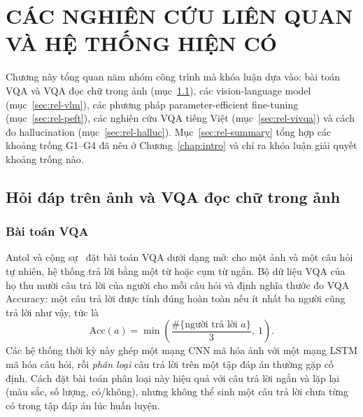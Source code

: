 
\chapter{CÁC NGHIÊN CỨU LIÊN QUAN VÀ HỆ THỐNG HIỆN CÓ}
\label{chap:related}

\ifpdf
    \graphicspath{{Chapter3/Figs/Raster/}{Chapter3/Figs/PDF/}{Chapter3/Figs/}}
\else
    \graphicspath{{Chapter3/Figs/Vector/}{Chapter3/Figs/}}
\fi


Chương này tổng quan năm nhóm công trình mà khóa luận dựa vào: bài toán VQA và
VQA đọc chữ trong ảnh (mục~\ref{sec:rel-vqa}), các vision-language model
(mục~\ref{sec:rel-vlm}), các phương pháp parameter-efficient fine-tuning
(mục~\ref{sec:rel-peft}), các nghiên cứu VQA tiếng Việt
(mục~\ref{sec:rel-vivqa}) và cách đo hallucination (mục~\ref{sec:rel-halluc}).
Mục~\ref{sec:rel-summary} tổng hợp các khoảng trống G1--G4 đã nêu ở
Chương~\ref{chap:intro} và chỉ ra khóa luận giải quyết khoảng trống nào.

\section{Hỏi đáp trên ảnh và VQA đọc chữ trong ảnh}
\label{sec:rel-vqa}

\subsection{Bài toán VQA}

Antol và cộng sự~\cite{antol2015vqa} đặt bài toán VQA dưới dạng mở: cho một ảnh và một câu hỏi
tự nhiên, hệ thống trả lời bằng một từ hoặc cụm từ ngắn. Bộ dữ liệu VQA của họ
thu mười câu trả lời của người cho mỗi câu hỏi và định nghĩa thước đo VQA
Accuracy: một câu trả lời được tính đúng hoàn toàn nếu ít nhất ba người cũng trả
lời như vậy, tức là
\begin{equation}
  \mathrm{Acc}(a) = \min\left(\frac{\#\{\text{người trả lời } a\}}{3},\ 1\right).
  \label{eq:vqaacc}
\end{equation}
Các hệ thống thời kỳ này ghép một mạng CNN mã hóa ảnh với một mạng LSTM mã hóa
câu hỏi, rồi \emph{phân loại} câu trả lời trên một tập đáp án thường gặp cố định.
Cách đặt bài toán phân loại này hiệu quả với câu trả lời ngắn và lặp lại (màu
sắc, số lượng, có/không), nhưng không thể sinh một câu trả lời chưa từng có trong
tập đáp án lúc huấn luyện.

